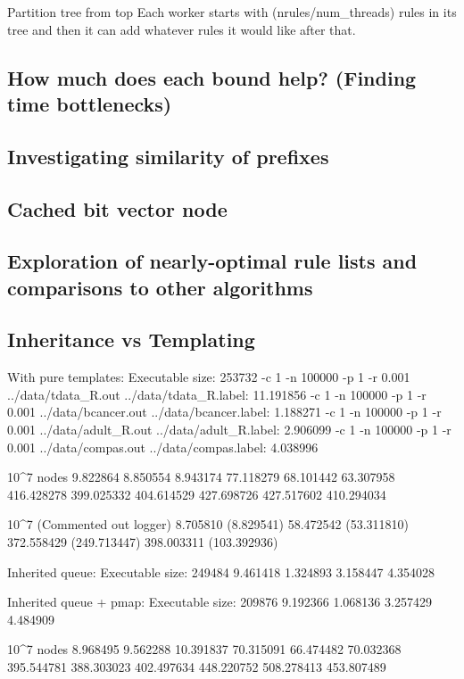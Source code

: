\documentclass[]{article}
\begin{document}
Partition tree from top
	Each worker starts with (nrules/num\_threads) rules in its tree and then it can add whatever rules it would like after that.

\subsection{How much does each bound help? (Finding time bottlenecks)}

\subsection{Investigating similarity of prefixes}

\subsection{Cached bit vector node}

\subsection{Exploration of nearly-optimal rule lists and comparisons to other algorithms}

\subsection{Inheritance vs Templating}

With pure templates:
Executable size: 253732
-c 1 -n 100000 -p 1 -r 0.001 ../data/tdata_R.out ../data/tdata_R.label: 11.191856
-c 1 -n 100000 -p 1 -r 0.001 ../data/bcancer.out ../data/bcancer.label: 1.188271
-c 1 -n 100000 -p 1 -r 0.001 ../data/adult_R.out ../data/adult_R.label: 2.906099
-c 1 -n 100000 -p 1 -r 0.001 ../data/compas.out ../data/compas.label: 4.038996

10^7 nodes
9.822864 8.850554 8.943174
77.118279 68.101442 63.307958
416.428278 399.025332 404.614529
427.698726 427.517602 410.294034

10^7 (Commented out logger)
8.705810 (8.829541)
58.472542 (53.311810)
372.558429 (249.713447)
398.003311 (103.392936)

Inherited queue:
Executable size: 249484
9.461418
1.324893
3.158447
4.354028

Inherited queue + pmap:
Executable size: 209876
9.192366
1.068136
3.257429
4.484909

10^7 nodes
8.968495 9.562288 10.391837
70.315091 66.474482 70.032368
395.544781 388.303023 402.497634
448.220752 508.278413 453.807489
\end{document}
